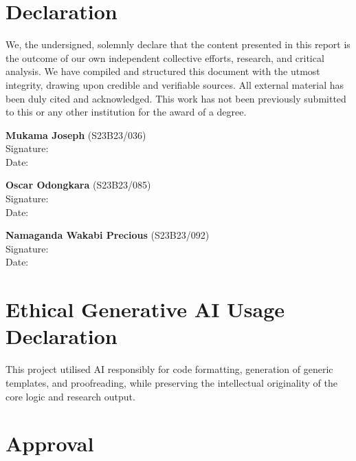 \documentclass[12pt]{report}
\begin{document}
\chapter*{Declaration}
\label{pre:01-declaration}

We, the undersigned, solemnly declare that the content presented in this report is the
outcome of our own independent collective efforts, research, and critical analysis. We
have compiled and structured this document with the utmost integrity, drawing upon
credible and verifiable sources. All external material has been duly cited and
acknowledged. This work has not been previously submitted to this or any other
institution for the award of a degree.

\vspace{1.5cm}

\noindent\textbf{Mukama Joseph} (S23B23/036)\\[0.3cm]
Signature: \dotfill\\[0.4cm]
Date: \dotfill

\vspace{1cm}

\noindent\textbf{Oscar Odongkara} (S23B23/085)\\[0.3cm]
Signature: \dotfill\\[0.4cm]
Date: \dotfill

\vspace{1cm}

\noindent\textbf{Namaganda Wakabi Precious} (S23B23/092)\\[0.3cm]
Signature: \dotfill\\[0.4cm]
Date: \dotfill


\chapter*{Ethical Generative AI Usage Declaration}
\label{pre:01b-AI-declaration}
This project utilised AI responsibly for code formatting, generation of generic templates, and proofreading, while preserving the intellectual originality of the core logic and research output.

\chapter*{Approval}
\label{pre:02-approval}
\end{document}
